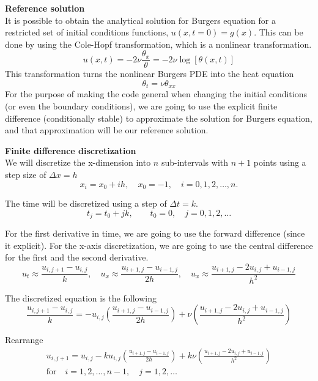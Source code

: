 \documentclass[a4paper,12pt]{article}
\theoremstyle{definition}
\begin{document}
\textbf{Reference solution}\\
It is possible to obtain the analytical solution for Burgers equation for a 
restricted set of initial conditions functions, $u(x,t=0) = g(x)$. This can be done by 
using the Cole-Hopf transformation, which is a nonlinear transformation\cite{kutluay1999numerical}.
\begin{equation}
u(x, t) = -2 \nu \frac{\theta_x}{\theta} = -2 \nu \log[\theta(x,t)]
\end{equation}
This transformation turns the nonlinear Burgers PDE into the heat equation
\begin{equation}
\theta_t = \nu \theta_{xx}
\end{equation}
For the purpose of making the code general when changing the initial conditions (or even the boundary conditions), 
we are going to use the explicit finite difference (conditionally stable) to approximate the solution for 
Burgers equation, and that approximation will be our reference solution.

\textbf{Finite difference discretization}\\
We will discretize the x-dimension into $n$ sub-intervals with $n+1$ points using a step size of $\Delta x = h$
$$
x_i = x_0 + ih, \quad x_0 = -1, \quad i = 0, 1, 2, \dots, n.
$$  

The time will be discretized using a step of $\Delta t = k$.
$$
t_j = t_0 + jk, \qquad t_0 = 0, \quad j = 0, 1, 2, \dots
$$

For the first derivative in time, we are going to use the forward difference (since it explicit). 
For the x-axis discretization, we are going to use the central difference for the first and the second derivative.
$$
u_t \approx \frac{u_{i,j+1} - u_{i, j}}{k}, \quad
u_x \approx \frac{ u_{i+1,j} - u_{i-1,j} }{2h}, \quad
u_x \approx \frac{ u_{i+1,j} - 2 u_{i,j} + u_{i-1,j} }{h^2}
$$

The discretized equation is the following
\begin{equation}
\frac{u_{i,j+1} - u_{i, j}}{k} =
- u_{i,j} \left( \frac{ u_{i+1,j} - u_{i-1,j} }{2h} \right)
+ \nu \left( \frac{ u_{i+1,j} - 2 u_{i,j} + u_{i-1,j} }{h^2} \right)
\end{equation}

Rearrange
\begin{multline}
u_{i,j+1}  = u_{i, j}
- k u_{i,j} \left( \frac{ u_{i+1,j} - u_{i-1,j} }{2h} \right)
+ k \nu \left( \frac{ u_{i+1,j} - 2 u_{i,j} + u_{i-1,j} }{h^2} \right)
\\ \text{for} \quad i=1, 2, \dots, n-1,  \quad j = 1, 2, \dots
\end{multline}
\end{document}
